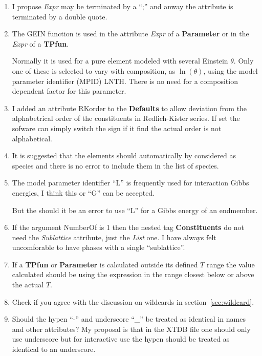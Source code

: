 \documentclass{article}
\begin{document}
\begin{enumerate}
\item I propose {\em Expr} may be terminated by a ``;'' and
  anway the attribute is terminated by a double quote.

\item The GEIN function is used in the attribute {\em Expr} of a {\bf
  Parameter} or in the {\em Expr} of a {\bf TPfun}.

  Normally it is used for a pure element modeled with several Einstein
  $\theta$.  Only one of these is selected to vary with composition,
  as $\ln(\theta)$, using the model parameter identifier (MPID) LNTH.
  There is no need for a composition dependent factor for this
  parameter.

\item I added an attribute {\rm RKorder} to the {\bf Defaults} to
  allow deviation from the alphabetrical order of the constituents in
  Redlich-Kister series.  If set the sofware can simply switch the
  sign if it find the actual order is not alphabetical.

\item It is suggested that the elements should automatically by
  considered as species and there is no error to include them in the
  list of species.

\item The model parameter identifier ``L'' is frequently used for
  interaction Gibbs energies, I think this or ``G'' can be accepted.

  But the should it be an error to use ``L'' for a Gibbs energy of an
  endmember.

\item If the argument NumberOf is 1 then the nested tag {\bf
  Constituents} do not need the {\em Sublattice} attribute, just the
  {\em List} one.  I have always felt uncomforable to have phases with
  a single ``sublattice''.

\item If a {\bf TPfun} or {\bf Parameter} is calculated outside its
  defined $T$ range the value calculated should be using the
  expression in the range closest below or above the actual $T$. 

\item Check if you agree with the discussion on wildcards in
  section~\ref{sec:wildcard}.

\item Should the hypen ``-'' and underscore ``\_'' be treated as
  identical in names and other attributes?  My proposal is that in the
  XTDB file one should only use underscore but for interactive use the
  hypen should be treated as identical to an underscore.


\end{enumerate}
\end{document}
